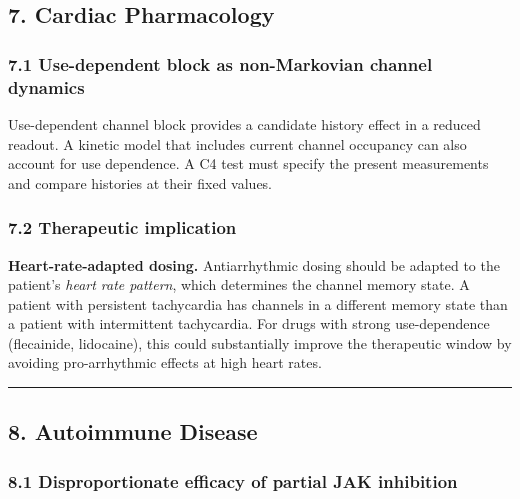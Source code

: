 \documentclass[
]{article}
\begin{document}
\hypertarget{cardiac-pharmacology}{%
\subsection{7. Cardiac Pharmacology}\label{cardiac-pharmacology}}

\hypertarget{use-dependent-block-as-non-markovian-channel-dynamics}{%
\subsubsection{7.1 Use-dependent block as non-Markovian channel
dynamics}\label{use-dependent-block-as-non-markovian-channel-dynamics}}

Use-dependent channel block provides a candidate history effect in a
reduced readout. A kinetic model that includes current channel occupancy
can also account for use dependence. A C4 test must specify the present
measurements and compare histories at their fixed values.

\hypertarget{therapeutic-implication-2}{%
\subsubsection{7.2 Therapeutic
implication}\label{therapeutic-implication-2}}

\textbf{Heart-rate-adapted dosing.} Antiarrhythmic dosing should be
adapted to the patient's \emph{heart rate pattern}, which determines the
channel memory state. A patient with persistent tachycardia has channels
in a different memory state than a patient with intermittent
tachycardia. For drugs with strong use-dependence (flecainide,
lidocaine), this could substantially improve the therapeutic window by
avoiding pro-arrhythmic effects at high heart rates.

\begin{center}\rule{0.5\linewidth}{0.5pt}\end{center}

\hypertarget{autoimmune-disease}{%
\subsection{8. Autoimmune Disease}\label{autoimmune-disease}}

\hypertarget{disproportionate-efficacy-of-partial-jak-inhibition}{%
\subsubsection{8.1 Disproportionate efficacy of partial JAK
inhibition}\label{disproportionate-efficacy-of-partial-jak-inhibition}}
\end{document}
